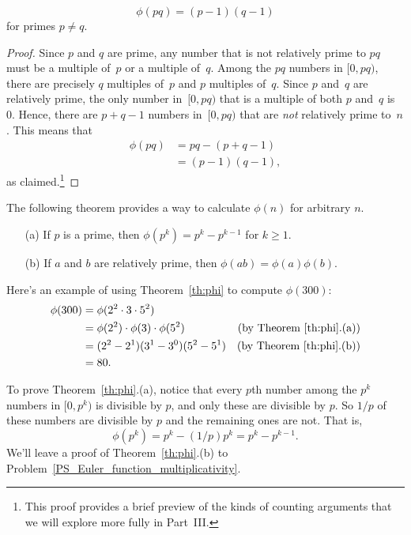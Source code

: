 \begin{lemma}\label{phi_pq}    %
\[
\phi(pq) = (p-1) (q-1)
\]
for primes $p\neq q$.
\end{lemma}

\begin{proof}
Since $p$ and $q$ are prime, any number that is not relatively prime
to $pq$ must be a multiple of~$p$ or a multiple of~$q$.  Among the
$pq$ numbers in $[0, pq)$, there are precisely $q$ multiples of~$p$
and $p$ multiples of~$q$.  Since $p$ and~$q$ are relatively prime, the
only number in~$[0, pq)$ that is a multiple of both $p$ and~$q$ is
0.  Hence, there are $p + q - 1$ numbers in~$[0, pq)$ that are
\emph{not} relatively prime to~$n$.  This means that
\begin{align*}
    \phi(pq) & = pq - (p + q - 1) \\
            & = (p - 1) (q - 1),
\end{align*}
as claimed.\footnote{This proof provides a brief preview of the
  kinds of counting arguments that we will explore more fully in
  Part~III.}  %
\end{proof}

The following theorem provides a way to calculate $\phi(n)$ for
arbitrary $n$.
\begin{theorem}\label{th:phi}\mbox{}
\begin{enumerate}
\item[(a)] If $p$ is a prime, then $\phi(p^k) = p^k - p^{k-1}$ for $k \geq 1$.
\item[(b)] If $a$ and $b$ are relatively prime, then $\phi(ab) = \phi(a)\phi(b)$.
\end{enumerate}
\end{theorem}

Here's an example of using Theorem~\ref{th:phi} to compute $\phi(300)$:
\begin{align*}
\phi(300)
    & = \phi(2^2 \cdot 3 \cdot 5^2)\\
    & = \phi(2^2) \cdot \phi(3) \cdot \phi(5^2)
            & \text{(by Theorem~\ref{th:phi}.(a))}\\
    & = (2^2 - 2^1) (3^1 - 3^0) (5^2 - 5^1) 
            & \text{(by Theorem~\ref{th:phi}.(b))}\\
    & = 80.
\end{align*}
\iffalse
We factor 300 in the first step, use part (1) of Theorem~\ref{th:phi}
twice in the second step, use part (2) in the third step, and then
simplify.
\fi

To prove Theorem~\ref{th:phi}.(a), notice that every $p$th number
among the $p^k$ numbers in $[0, p^{k})$ is
divisible by $p$, and only these are divisible by $p$.  So $1/p$ of
these numbers are divisible by $p$ and the remaining ones are not.  That is,
\[
\phi(p^{k}) = p^k - (1/p)p^k = p^k -p^{k-1}.
\]
We'll leave a proof of Theorem~\ref{th:phi}.(b) to
Problem~\ref{PS_Euler_function_multiplicativity}.

